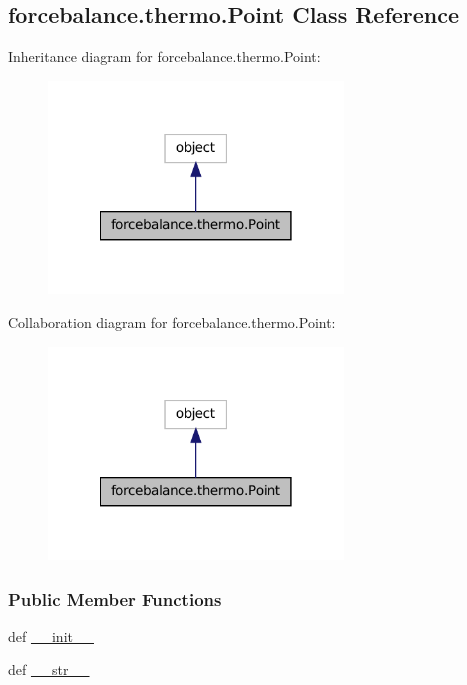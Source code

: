 \hypertarget{classforcebalance_1_1thermo_1_1Point}{\subsection{forcebalance.\-thermo.\-Point Class Reference}
\label{classforcebalance_1_1thermo_1_1Point}
}


Inheritance diagram for forcebalance.\-thermo.\-Point\-:
\nopagebreak
\begin{figure}[H]
\begin{center}
\leavevmode
\includegraphics[width=222pt]{classforcebalance_1_1thermo_1_1Point__inherit__graph}
\end{center}
\end{figure}


Collaboration diagram for forcebalance.\-thermo.\-Point\-:
\nopagebreak
\begin{figure}[H]
\begin{center}
\leavevmode
\includegraphics[width=222pt]{classforcebalance_1_1thermo_1_1Point__coll__graph}
\end{center}
\end{figure}
\subsubsection*{Public Member Functions}
\begin{DoxyCompactItemize}
\item 
def \hyperlink{classforcebalance_1_1thermo_1_1Point_a959ad9ce8f18cfb08a55900b80ba3734}{\-\_\-\-\_\-init\-\_\-\-\_\-}
\item 
def \hyperlink{classforcebalance_1_1thermo_1_1Point_a63e18cc925cd93affb2347b8cdbca9a0}{\-\_\-\-\_\-str\-\_\-\-\_\-}
\end{DoxyCompactItemize}
